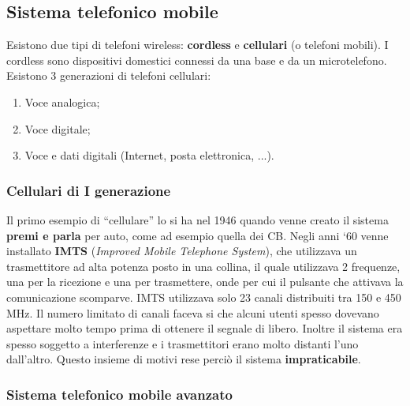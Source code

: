 \subsection{Sistema telefonico mobile}

Esistono due tipi di telefoni wireless: \textbf{cordless} e \textbf{cellulari} (o telefoni mobili). I cordless sono dispositivi domestici connessi da una base e da un microtelefono.
Esistono 3 generazioni di telefoni cellulari:

\begin{enumerate}

\item{Voce analogica};
\item{Voce digitale};
\item{Voce e dati digitali (Internet, posta elettronica, ...)}.

\end{enumerate}

\subsubsection{Cellulari di I generazione}

Il primo esempio di ``cellulare'' lo si ha nel 1946 quando venne creato il sistema \textbf{premi e parla} per auto, come ad esempio quella dei CB. Negli anni `60 venne installato \textbf{IMTS} (\textit{Improved Mobile Telephone System}), che utilizzava un trasmettitore ad alta potenza posto in una collina, il quale utilizzava 2 frequenze, una per la ricezione e una per trasmettere, onde per cui il pulsante che attivava la comunicazione scomparve. IMTS utilizzava solo 23 canali distribuiti tra 150 e 450 MHz. Il numero limitato di canali faceva si che alcuni utenti spesso dovevano aspettare molto tempo prima di ottenere il segnale di libero. Inoltre il sistema era spesso soggetto a interferenze e i trasmettitori erano molto distanti l'uno dall'altro. Questo insieme di motivi rese perciò il sistema \textbf{impraticabile}.

\subsubsection*{Sistema telefonico mobile avanzato}

